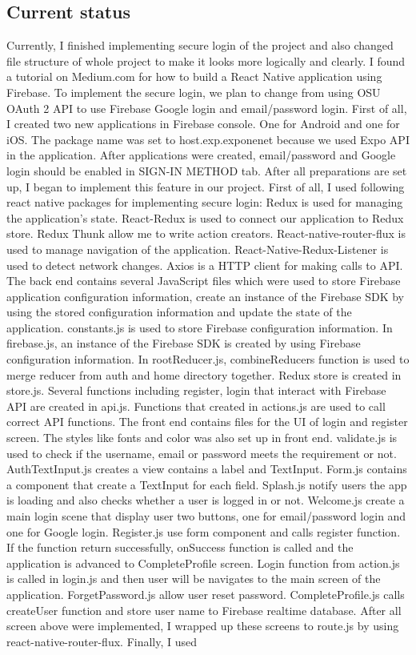 \documentclass[letterpaper, 10pt,titlepage]{article}
\begin{document}
\subsection{Current status}
Currently, I finished implementing secure login of the project and also changed file structure of whole project to make it looks more logically and clearly. I found a tutorial on Medium.com for how to build a React Native application using Firebase. To implement the secure login, we plan to change from using OSU OAuth 2 API to use Firebase Google login and email/password login. First of all, I created two new applications in Firebase console. One for Android and one for iOS. The package name was set to host.exp.exponenet because we used Expo API in the application. After applications were created, email/password and Google login should be enabled in SIGN-IN METHOD tab. After all preparations are set up, I began to implement this feature in our project. First of all, I used following react native packages for implementing secure login: Redux is used for managing the application's state. React-Redux is used to connect our application to Redux store. Redux Thunk allow me to write action creators. React-native-router-flux is used to manage navigation of the application. React-Native-Redux-Listener is used to detect network changes. Axios is a HTTP client for making calls to API. The back end contains several JavaScript files which were used to store Firebase application configuration information, create an instance of the Firebase SDK by using the stored configuration information and update the state of the application. constants.js is used to store Firebase configuration information. In firebase.js, an instance of the Firebase SDK is created by using Firebase configuration information. In rootReducer.js, combineReducers function is used to merge reducer from auth and home directory together. Redux store is created in store.js. Several functions including register, login that interact with Firebase API are created in api.js. Functions that created in actions.js are used to call correct API functions. The front end contains files for the UI of login and register screen. The styles like fonts and color was also set up in front end. validate.js is used to check if the username, email or password meets the requirement or not. AuthTextInput.js creates a view contains a label and TextInput. Form.js contains a component that create a TextInput for each field. Splash.js notify users the app is loading and also checks whether a user is logged in or not. Welcome.js create a main login scene that display user two buttons, one for email/password login and one for Google login. Register.js use form component and calls register function. If the function return successfully, onSuccess function is called and the application is advanced to CompleteProfile screen. Login function from action.js is called in login.js and then user will be navigates to the main screen of the application. ForgetPassword.js allow user reset password. CompleteProfile.js calls createUser function and store user name to Firebase realtime database. After all screen above were implemented, I wrapped up these screens to route.js by using react-native-router-flux. Finally, I used 
\end{document}
